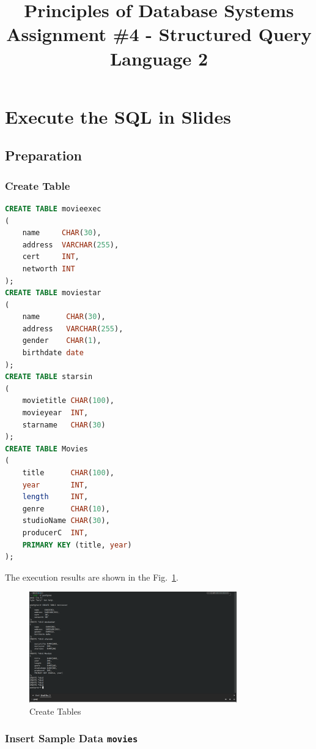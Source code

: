 \documentclass{cshwk}
\title{Principles of Database Systems\\Assignment \#4 - Structured Query Language 2}
\begin{document}
\maketitle

\section{Execute the SQL in Slides}

\subsection{Preparation}

\subsubsection{Create Table}

\begin{lstlisting}[language=sql]
CREATE TABLE movieexec
(
    name     CHAR(30),
    address  VARCHAR(255),
    cert     INT,
    networth INT
);
CREATE TABLE moviestar
(
    name      CHAR(30),
    address   VARCHAR(255),
    gender    CHAR(1),
    birthdate date
);
CREATE TABLE starsin
(
    movietitle CHAR(100),
    movieyear  INT,
    starname   CHAR(30)
);
CREATE TABLE Movies
(
    title      CHAR(100),
    year       INT,
    length     INT,
    genre      CHAR(10),
    studioName CHAR(30),
    producerC  INT,
    PRIMARY KEY (title, year)
);
\end{lstlisting}

The execution results are shown in the Fig.~\ref{fig:create-tables}.
\begin{figure}[H]
    \centering
    \includegraphics[width=0.8\textwidth]{hw5-1.png}
    \caption{Create Tables}
    \label{fig:create-tables}
\end{figure}

\subsubsection{Insert Sample Data \texttt{movies}}
\end{document}
